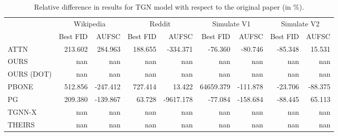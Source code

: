 \begin{table}
\centering
\begin{tabular}{lrrrrrrrr}
\toprule
 & \multicolumn{2}{c}{Wikipedia} & \multicolumn{2}{c}{Reddit} & \multicolumn{2}{c}{Simulate V1} & \multicolumn{2}{c}{Simulate V2} \\
 & Best FID & AUFSC & Best FID & AUFSC & Best FID & AUFSC & Best FID & AUFSC \\
\midrule
ATTN & 213.602 & 284.963 & 188.655 & -334.371 & -76.360 & -80.746 & -85.348 & 15.531 \\
OURS & nan & nan & nan & nan & nan & nan & nan & nan \\
OURS (DOT) & nan & nan & nan & nan & nan & nan & nan & nan \\
PBONE & 512.856 & -247.412 & 727.414 & 13.422 & 64659.379 & -111.878 & -23.706 & -88.375 \\
PG & 209.380 & -139.867 & 63.728 & -9617.178 & -77.084 & -158.684 & -88.445 & 65.113 \\
TGNN-X & nan & nan & nan & nan & nan & nan & nan & nan \\
THEIRS & nan & nan & nan & nan & nan & nan & nan & nan \\
\bottomrule
\end{tabular}
\caption{\label{tab:tgn_results_diff}Relative difference in results for TGN model with respect to the original paper (in \%).}
\end{table}
